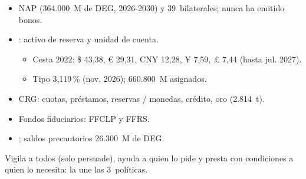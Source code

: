 \documentclass{article}
\begin{document}
\begin{columnas}
\begin{itemize}
\item NAP (364.000~M de DEG, 2026-2030) y 39~bilaterales; nunca ha emitido bonos.
\item {}: activo de reserva y unidad de cuenta.
  \begin{itemize}
  \item Cesta 2022: \$ 43,38, € 29,31, CNY 12,28, ¥ 7,59, £ 7,44 (hasta jul. 2027).
  \item Tipo 3,119\,\% (nov. 2026); 660.800~M asignados.
  \end{itemize}
\end{itemize}
\begin{itemize}
\item CRG: cuotas, préstamos, reservas / monedas, crédito, oro (2.814~t).
\item Fondos fiduciarios: FFCLP y FFRS.
\item {}; saldos precautorios 26.300~M de DEG.
\end{itemize}

\begin{ideaclave}
Vigila a todos (solo persuade), ayuda a quien lo pide y presta con condiciones a quien lo necesita: la  une las 3~políticas.
\end{ideaclave}


\end{columnas}
\end{document}
